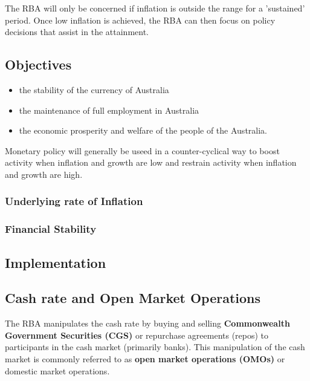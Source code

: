 \documentclass[11pt]{article}
\begin{document}
The RBA will only be concerned if inflation is outside the range for a
'sustained' period. Once low inflation is achieved, the RBA can then
focus on policy decisions that assist in the attainment.

\subsection{Objectives}
\label{sec-3-3}

\begin{itemize}
\item the stability of the currency of Australia
\item the maintenance of full employment in Australia
\item the economic prosperity and welfare of the people of the Australia.
\end{itemize}

Monetary policy will generally be useed in a counter-cyclical way to
boost activity when inflation and growth are low and restrain activity
when inflation and growth are high.

\subsubsection{Underlying rate of Inflation}
\label{sec-3-3-1}



\subsubsection{Financial Stability}
\label{sec-3-3-2}



\subsection{Implementation}
\label{sec-3-4}

\subsection{Cash rate and Open Market Operations}
\label{sec-3-5}

The RBA manipulates the cash rate by buying and selling \textbf{Commonwealth
Government Securities (CGS)} or repurchase agreements (repos) to
participants in the cash market (primarily banks). This manipulation
of the cash market is commonly referred to as \textbf{open market operations
(OMOs)} or domestic market operations.
\end{document}
